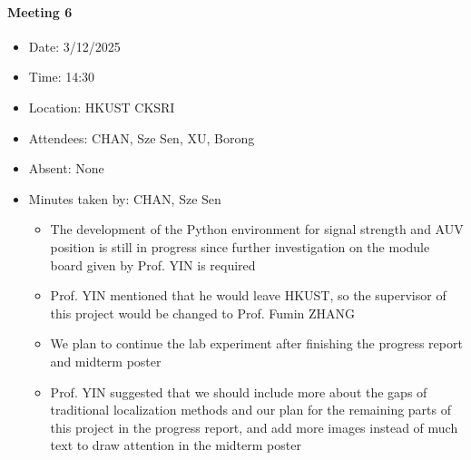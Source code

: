 \documentclass[11pt]{article}
\begin{document}
    \paragraph{Meeting 6}
    \begin{itemize}
        \item Date: 3/12/2025
        \item Time: 14:30
        \item Location: HKUST CKSRI
        \item Attendees: CHAN, Sze Sen, XU, Borong
        \item Absent: None
        \item Minutes taken by: CHAN, Sze Sen
        \begin{itemize}
            \item The development of the Python environment for signal strength and AUV position is still in progress since further investigation on the module board given by Prof. YIN is required
            \item Prof. YIN mentioned that he would leave HKUST, so the supervisor of this project would be changed to Prof. Fumin ZHANG
            \item We plan to continue the lab experiment after finishing the progress report and midterm poster
            \item Prof. YIN suggested that we should include more about the gaps of traditional localization methods and our plan for the remaining parts of this project in the progress report, and add more images instead of much text to draw attention in the midterm poster
        \end{itemize}
    \end{itemize}
    
\end{document}
